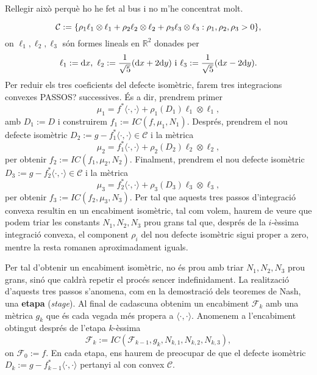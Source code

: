{\color{blue}Rellegir això perquè ho he fet al bus i no m'he concentrat molt.}

\begin{equation*}
    \mathcal C:=\{\rho_1\ell_1\otimes\ell_1 + \rho_2\ell_2\otimes\ell_2 + \rho_3\ell_3\otimes\ell_3 : \rho_1, \rho_2, \rho_3 > 0\},
\end{equation*}
on $\ell_1, \ell_2, \ell_3$ són formes lineals en $\mathbb R^2$ donades per 
\begin{equation*}
    \ell_1:=\text dx, \text{ } \ell_2:=\frac{1}{\sqrt5}(\text dx + 2\text dy) \text{ i } \ell_3:=\frac{1}{\sqrt5}(\text dx - 2\text dy).
\end{equation*}
Per reduir els tres coeficients del defecte isomètric, farem tres integracions convexes {\color{blue} PASSOS?} successives. És a dir, prendrem primer
\begin{equation*}
    \mu_1 = f^*\langle\cdot, \cdot\rangle + \rho_1(D_1)\ell_1\otimes\ell_1,
\end{equation*}
amb $D_1:=D$ i construirem $f_1:=IC(f, \mu_1, N_1)$. Després, prendrem el nou defecte isomètric $D_2 := g-f_1^*\langle\cdot, \cdot\rangle\in\mathcal C$ i la mètrica
\begin{equation*}
    \mu_2 = f_1^*\langle\cdot, \cdot\rangle + \rho_2(D_2)\ell_2\otimes\ell_2,
\end{equation*}
 per obtenir $f_2:=IC(f_1, \mu_2, N_2)$. Finalment, prendrem el nou defecte isomètric $D_3 := g-f_2^*\langle\cdot, \cdot\rangle\in\mathcal C$ i la mètrica
\begin{equation*}
    \mu_3 = f_2^*\langle\cdot, \cdot\rangle + \rho_3(D_3)\ell_3\otimes\ell_3,
\end{equation*}
per obtenir $f_3:=IC(f_2, \mu_3, N_3)$. Per tal que aquests tres passos d'integració convexa resultin en un encabiment isomètric, tal com volem, haurem de veure que podem triar les constants $N_1, N_2, N_3$ prou grans tal que, després de la $i$-èssima integració convexa, el component $\rho_i$ del nou defecte isomètric sigui proper a zero, mentre la resta romanen aproximadament iguals. 

Per tal d'obtenir un encabiment isomètric, no és prou amb triar $N_1, N_2, N_3$ prou grans, sinó que caldrà repetir el procés sencer indefinidament. La realització d'aquests tres passos s'anomena, com en la demostració dels teoremes de Nash, una \textbf{etapa} (\textit{stage}). Al final de cadascuna obtenim un encabiment $\mathcal F_k$ amb una mètrica $g_k$ que és cada vegada més propera a $\langle\cdot, \cdot\rangle$. Anomenem a l'encabiment obtingut després de l'etapa $k$-èssima 
\begin{equation*}
    \mathcal F_k:=IC(\mathcal F_{k-1}, g_k, N_{k,1}, N_{k,2}, N_{k,3}),
\end{equation*}
on $\mathcal F_0:=f$. En cada etapa, ens haurem de preocupar de que el defecte isomètric $D_k:=g-f_{k-1}^*\langle\cdot, \cdot\rangle$ pertanyi al con convex $\mathcal C$.

